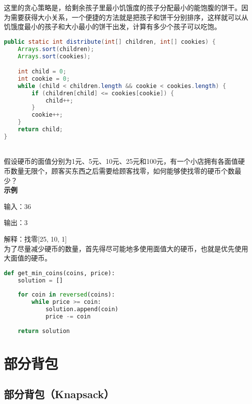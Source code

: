 这里的贪心策略是，给剩余孩子里最小饥饿度的孩子分配最小的能饱腹的饼干。因为需要获得大小关系，一个便捷的方法就是把孩子和饼干分别排序，这样就可以从饥饿度最小的孩子和大小最小的饼干出发，计算有多少个孩子可以吃饱。

\vspace{-0.5cm}

\begin{lstlisting}[language=Java]
public static int distribute(int[] children, int[] cookies) {
    Arrays.sort(children);
    Arrays.sort(cookies);

    int child = 0;
    int cookie = 0;
    while (child < children.length && cookie < cookies.length) {
        if (children[child] <= cookies[cookie]) {
            child++;
        }
        cookie++;
    }
    return child;
}
\end{lstlisting}

\vspace{0.5cm}

\\

假设硬币的面值分别为1元、5元、10元、25元和100元，有一个小店拥有各面值硬币数量无限个，顾客买东西之后需要给顾客找零，如何能够使找零的硬币个数最少？\\

\textbf{示例}

输入：36

输出：3

解释：找零[25, 10, 1]\\

为了尽量减少硬币的数量，首先得尽可能地多使用面值大的硬币，也就是优先使用大面值的硬币。

\vspace{-0.5cm}

\begin{lstlisting}[language=Python]
def get_min_coins(coins, price):
    solution = []
    
    for coin in reversed(coins):
        while price >= coin:
            solution.append(coin)
            price -= coin
    
    return solution
\end{lstlisting}

\newpage

\section{部分背包}

\subsection{部分背包（Knapsack）}


